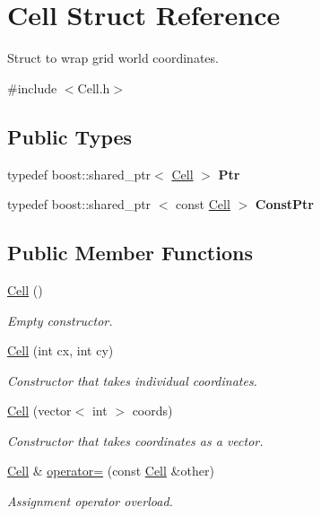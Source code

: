 \hypertarget{struct_cell}{\section{\-Cell \-Struct \-Reference}
\label{struct_cell}
}


\-Struct to wrap grid world coordinates.  




{\ttfamily \#include $<$\-Cell.\-h$>$}

\subsection*{\-Public \-Types}
\begin{DoxyCompactItemize}
\item 
\hypertarget{struct_cell_aad39d5dee4e425f0969cf18c606feff9}{typedef boost\-::shared\-\_\-ptr$<$ \hyperlink{struct_cell}{\-Cell} $>$ {\bfseries \-Ptr}}\label{struct_cell_aad39d5dee4e425f0969cf18c606feff9}

\item 
\hypertarget{struct_cell_a68e568cf815bfcf579f3df96721b030f}{typedef boost\-::shared\-\_\-ptr\*
$<$ const \hyperlink{struct_cell}{\-Cell} $>$ {\bfseries \-Const\-Ptr}}\label{struct_cell_a68e568cf815bfcf579f3df96721b030f}

\end{DoxyCompactItemize}
\subsection*{\-Public \-Member \-Functions}
\begin{DoxyCompactItemize}
\item 
\hyperlink{struct_cell_a394510643e8664cf12b5efaf5cb99f71}{\-Cell} ()
\begin{DoxyCompactList}\small\item\em \-Empty constructor. \end{DoxyCompactList}\item 
\hyperlink{struct_cell_a6d6d45beb3605fa91a4fde164ca1f2e7}{\-Cell} (int cx, int cy)
\begin{DoxyCompactList}\small\item\em \-Constructor that takes individual coordinates. \end{DoxyCompactList}\item 
\hyperlink{struct_cell_a26337b4abd24ec554fc4df0c20599fc3}{\-Cell} (vector$<$ int $>$ coords)
\begin{DoxyCompactList}\small\item\em \-Constructor that takes coordinates as a vector. \end{DoxyCompactList}\item 
\hyperlink{struct_cell}{\-Cell} \& \hyperlink{struct_cell_ac1c53fcae0c0be453d0312310ed80fc9}{operator=} (const \hyperlink{struct_cell}{\-Cell} \&other)
\begin{DoxyCompactList}\small\item\em \-Assignment operator overload. \end{DoxyCompactList}\end{DoxyCompactItemize}
